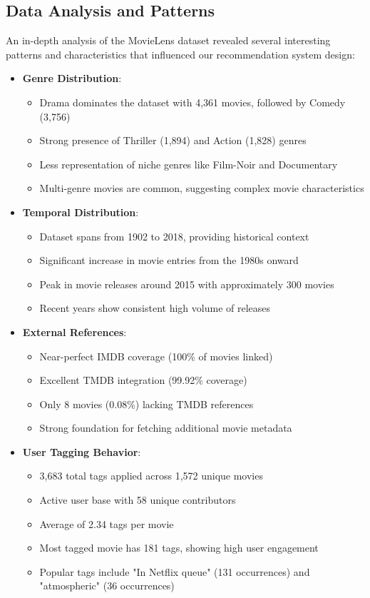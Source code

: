\documentclass[12pt]{article}
\begin{document}
\subsection{Data Analysis and Patterns}
An in-depth analysis of the MovieLens dataset revealed several interesting patterns and characteristics that influenced our recommendation system design:

\begin{itemize}
    \item \textbf{Genre Distribution}:
    \begin{itemize}
        \item Drama dominates the dataset with 4,361 movies, followed by Comedy (3,756)
        \item Strong presence of Thriller (1,894) and Action (1,828) genres
        \item Less representation of niche genres like Film-Noir and Documentary
        \item Multi-genre movies are common, suggesting complex movie characteristics
    \end{itemize}
    
    \item \textbf{Temporal Distribution}:
    \begin{itemize}
        \item Dataset spans from 1902 to 2018, providing historical context
        \item Significant increase in movie entries from the 1980s onward
        \item Peak in movie releases around 2015 with approximately 300 movies
        \item Recent years show consistent high volume of releases
    \end{itemize}
    
    \item \textbf{External References}:
    \begin{itemize}
        \item Near-perfect IMDB coverage (100\% of movies linked)
        \item Excellent TMDB integration (99.92\% coverage)
        \item Only 8 movies (0.08\%) lacking TMDB references
        \item Strong foundation for fetching additional movie metadata
    \end{itemize}
    
    \item \textbf{User Tagging Behavior}:
    \begin{itemize}
        \item 3,683 total tags applied across 1,572 unique movies
        \item Active user base with 58 unique contributors
        \item Average of 2.34 tags per movie
        \item Most tagged movie has 181 tags, showing high user engagement
        \item Popular tags include "In Netflix queue" (131 occurrences) and "atmospheric" (36 occurrences)
    \end{itemize}
\end{itemize}
\end{document}

